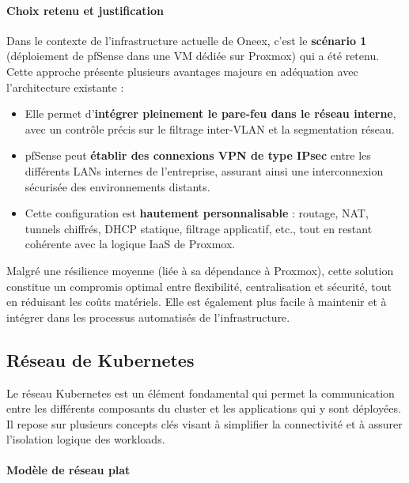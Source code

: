 \paragraph{Choix retenu et justification}

Dans le contexte de l’infrastructure actuelle de Oneex, c’est le \textbf{scénario 1} (déploiement de pfSense dans une VM dédiée sur Proxmox) qui a été retenu. Cette approche présente plusieurs avantages majeurs en adéquation avec l’architecture existante :

\begin{itemize}
	\item Elle permet d’\textbf{intégrer pleinement le pare-feu dans le réseau interne}, avec un contrôle précis sur le filtrage inter-VLAN et la segmentation réseau.
	\item pfSense peut \textbf{établir des connexions VPN de type IPsec} entre les différents LANs internes de l’entreprise, assurant ainsi une interconnexion sécurisée des environnements distants.
	\item Cette configuration est \textbf{hautement personnalisable} : routage, NAT, tunnels chiffrés, DHCP statique, filtrage applicatif, etc., tout en restant cohérente avec la logique IaaS de Proxmox.
\end{itemize}

Malgré une résilience moyenne (liée à sa dépendance à Proxmox), cette solution constitue un compromis optimal entre flexibilité, centralisation et sécurité, tout en réduisant les coûts matériels. Elle est également plus facile à maintenir et à intégrer dans les processus automatisés de l'infrastructure.

\subsection{Réseau de Kubernetes}

Le réseau Kubernetes est un élément fondamental qui permet la communication entre les différents composants du cluster et les applications qui y sont déployées. Il repose sur plusieurs concepts clés visant à simplifier la connectivité et à assurer l’isolation logique des workloads.

\paragraph{Modèle de réseau plat}


